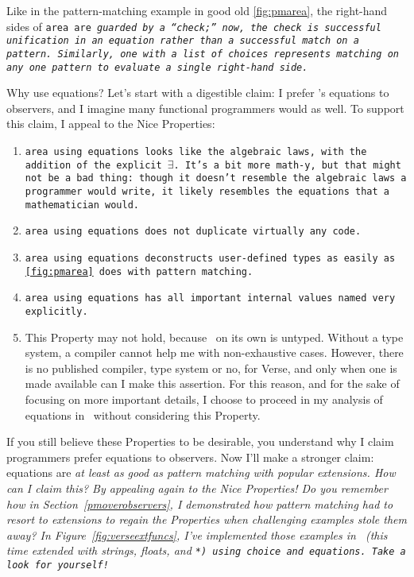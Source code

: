 \documentclass[manuscript,screen,review, 12pt, nonacm]{acmart}
\begin{document}
    Like in the pattern-matching example in good old \ref{fig:pmarea}, the
    right-hand sides of \tt{area} are \it{guarded} by a “check;” now, the check
    is successful unification in an equation rather than a successful match on a
    pattern. Similarly, \tt{one} with a list of choices represents matching on
    any \it{one} pattern to evaluate a single right-hand side. 

    Why use equations? Let's start with a digestible claim: I prefer \VC's
    equations to observers, and I imagine many functional programmers would as
    well. To support this claim, I appeal to the Nice Properties: 

    \begin{enumerate}
      \item \tt{area} using equations looks like the algebraic laws, with the
      addition of the explicit $\exists$. It's a bit more math-y, but that might
      not be a bad thing: though it doesn't resemble the algebraic laws a
      programmer would write, it likely resembles the equations that a
      mathematician would. 
      \item \tt{area} using equations does not duplicate virtually any code. 
      \item \tt{area} using equations deconstructs user-defined types as easily
      as \ref{fig:pmarea} does with pattern matching. 
      \item \tt{area} using equations has all important internal values named
      very explicitly.
      \item This Property may not hold, because \VC\ on its own is untyped.
      Without a type system, a compiler cannot help me with non-exhaustive
      cases. However, there is no published compiler, type system or no, for
      Verse, and only when one is made available can I make this assertion. For
      this reason, and for the sake of focusing on more important details, I
      choose to proceed in my analysis of equations in \VC\ without considering
      this Property. 
    \end{enumerate}

    If you still believe these Properties to be desirable, you understand why I
    claim programmers prefer equations to observers. Now I'll make a stronger
    claim: equations are \it{at least as good as} pattern matching with popular
    extensions. How can I claim this? By appealing again to the Nice Properties!
    Do you remember how in Section~\ref{pmoverobservers}, I demonstrated how
    pattern matching had to resort to extensions to regain the Properties when
    challenging examples stole them away? In Figure~\ref{fig:verseextfuncs},
    I've implemented those examples in \VC\ (this time extended with strings,
    floats, and \tt{*}) using choice and equations. Take a look for yourself! 
\end{document}
